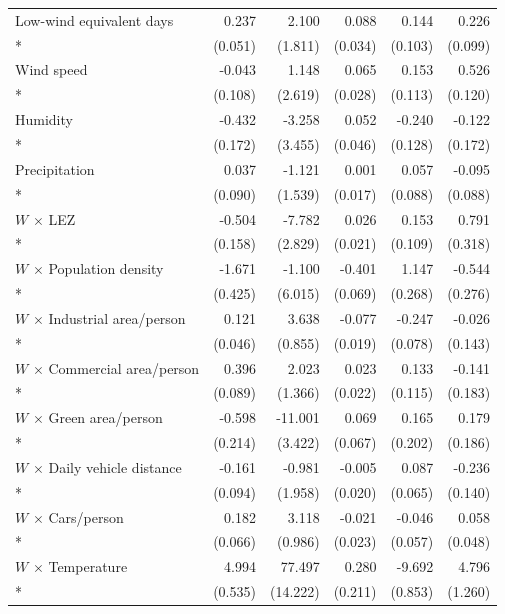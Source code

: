 \begin{longtable}{lrrrrr}
\addlinespace[1pt]
Low-wind equivalent days & 0.237 & 2.100 & 0.088 & 0.144 & 0.226 \\*
 & (0.051) & (1.811) & (0.034) & (0.103) & (0.099) \\
\addlinespace[1pt]
Wind speed & -0.043 & 1.148 & 0.065 & 0.153 & 0.526 \\*
 & (0.108) & (2.619) & (0.028) & (0.113) & (0.120) \\
\addlinespace[1pt]
Humidity & -0.432 & -3.258 & 0.052 & -0.240 & -0.122 \\*
 & (0.172) & (3.455) & (0.046) & (0.128) & (0.172) \\
\addlinespace[1pt]
Precipitation & 0.037 & -1.121 & 0.001 & 0.057 & -0.095 \\*
 & (0.090) & (1.539) & (0.017) & (0.088) & (0.088) \\
\addlinespace[1pt]
$W$ $\times$ LEZ & -0.504 & -7.782 & 0.026 & 0.153 & 0.791 \\*
 & (0.158) & (2.829) & (0.021) & (0.109) & (0.318) \\
\addlinespace[1pt]
$W$ $\times$ Population density & -1.671 & -1.100 & -0.401 & 1.147 & -0.544 \\*
 & (0.425) & (6.015) & (0.069) & (0.268) & (0.276) \\
\addlinespace[1pt]
$W$ $\times$ Industrial area/person & 0.121 & 3.638 & -0.077 & -0.247 & -0.026 \\*
 & (0.046) & (0.855) & (0.019) & (0.078) & (0.143) \\
\addlinespace[1pt]
$W$ $\times$ Commercial area/person & 0.396 & 2.023 & 0.023 & 0.133 & -0.141 \\*
 & (0.089) & (1.366) & (0.022) & (0.115) & (0.183) \\
\addlinespace[1pt]
$W$ $\times$ Green area/person & -0.598 & -11.001 & 0.069 & 0.165 & 0.179 \\*
 & (0.214) & (3.422) & (0.067) & (0.202) & (0.186) \\
\addlinespace[1pt]
$W$ $\times$ Daily vehicle distance & -0.161 & -0.981 & -0.005 & 0.087 & -0.236 \\*
 & (0.094) & (1.958) & (0.020) & (0.065) & (0.140) \\
\addlinespace[1pt]
$W$ $\times$ Cars/person & 0.182 & 3.118 & -0.021 & -0.046 & 0.058 \\*
 & (0.066) & (0.986) & (0.023) & (0.057) & (0.048) \\
\addlinespace[1pt]
$W$ $\times$ Temperature & 4.994 & 77.497 & 0.280 & -9.692 & 4.796 \\*
 & (0.535) & (14.222) & (0.211) & (0.853) & (1.260) \\

\end{longtable}
